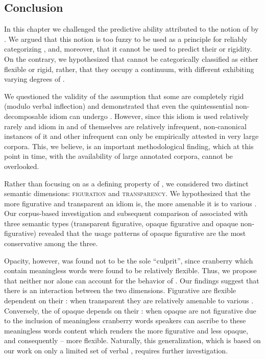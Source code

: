 \documentclass[output=paper]{langsci/langscibook}
\begin{document}
\subsection{Conclusion}


In this chapter we challenged the predictive ability attributed to the notion of  by \citet{nunberg94}. We argued that this notion is too fuzzy to be used as a principle for reliably categorizing , and, moreover, that it cannot be used to predict their  or rigidity. On the contrary, we hypothesized that  cannot be categorically classified as either flexible or rigid, rather, that they occupy a continuum, with different  exhibiting varying degrees of .

We questioned the validity of the assumption that some  are completely rigid (modulo verbal inflection) and demonstrated that even the quintessential non-decomposable idiom  can undergo . However, since this idiom is used relatively rarely and idiom  in and of themselves are relatively infrequent, non-canonical instances of it and other infrequent  can only be empirically attested in very large corpora. This, we believe, is an important methodological finding, which at this point in time, with the availability of large annotated corpora, cannot be overlooked.

Rather than focusing on  as a defining property of , we considered two distinct semantic dimensions: {\scshape figuration} and {\scshape transparency}. We hypothesized that the more figurative and transparent an idiom is, the more amenable it is to various . Our corpus-based investigation and subsequent comparison of  associated with three semantic types (transparent figurative, opaque figurative and opaque non-figurative) revealed that the usage patterns of opaque figurative  are the most conservative among the three.

Opacity, however, was found not to be the sole ``culprit'', since cranberry  which contain meaningless words were found to be relatively flexible. Thus, we propose that neither  nor  alone can account for the behavior of . Our findings suggest that there is an interaction between the two dimensions. Figurative  are flexible dependent on their : when transparent they are relatively amenable to various . Conversely, the  of opaque  depends on their : when opaque  are not figurative due to the inclusion of meaningless cranberry words speakers can ascribe to these meaningless words content which renders the  more figurative and less opaque, and consequently -- more flexible. Naturally, this generalization, which is based on our work on only a limited set of  verbal , requires further investigation.
\end{document}
